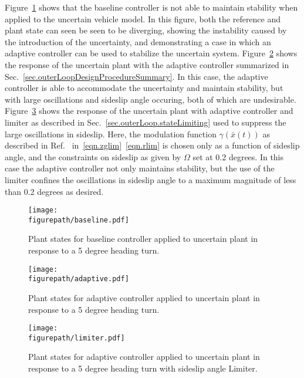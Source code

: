 \documentclass[journal]{IEEEtran}
\newcommand{\figurepath}{../fig}
\theoremstyle{innercustomthm}
\begin{document}
  Figure~\ref{fig.baselineUncertainLatrState} shows that the baseline controller is not able to maintain stability when applied to the uncertain vehicle model.
  In this figure, both the reference and plant state can seen be seen to be diverging, showing the instability caused by the introduction of the uncertainty, and demonstrating a case in which an adaptive controller can be used to stabilize the uncertain system.
  Figure~\ref{fig.adaptiveUncertainLatrState} shows the response of the uncertain plant with the adaptive controller summarized in Sec.~\ref{sec.outerLoopDesignProcedureSummary}.
  In this case, the adaptive controller is able to accommodate the uncertainty and maintain stability, but with large oscillations and sideslip angle occuring, both of which are undesirable.
  Figure~\ref{fig.stateLimiterState} shows the response of the uncertain plant with adaptive controller and limiter as described in Sec.~\ref{sec.outerLoop.stateLimiting} used to suppress the large oscillations in sideslip.
  Here, the modulation function $\gamma(\bar{x}(t))$ as described in Ref.\ \cite{lavretskywise.book.2013} in\ \eqref{eqn.zglim}\ \eqref{eqn.rlim} is chosen only as a function of sideslip angle, and the constraints on sideslip as given by $\Omega$ set at 0.2 degrees.
  In this case the adaptive controller not only maintains stability, but the use of the limiter confines the oscillations in sideslip angle to a maximum magnitude of less than 0.2 degrees as desired.

  \begin{figure}[H]
    \hspace{-0.2in}
    \texttt{[image: \\figurepath/baseline.pdf]}
    \vspace{-0.5in}
    \caption{Plant states for baseline controller applied to uncertain plant in response to a 5 degree heading turn.\label{fig.baselineUncertainLatrState}}
  \end{figure}

  \begin{figure}[H]
    \hspace{-0.2in}
    \texttt{[image: \\figurepath/adaptive.pdf]}%
    \vspace{-0.4in}
    \caption{Plant states for adaptive controller applied to uncertain plant in response to a 5 degree heading turn.\label{fig.adaptiveUncertainLatrState}}
  \end{figure}

  \begin{figure}[H]
    \hspace{-0.2in}
    \texttt{[image: \\figurepath/limiter.pdf]}%
    \vspace{-0.3in}
    \caption{Plant states for adaptive controller applied to uncertain plant in response to a 5 degree heading turn with sideslip angle Limiter.\label{fig.stateLimiterState}}
  \end{figure}
\end{document}
